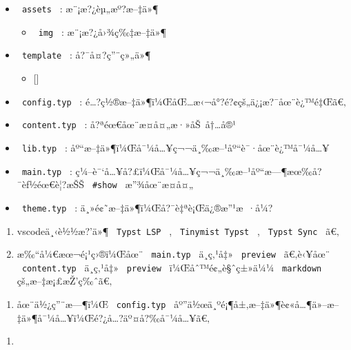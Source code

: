 \begin{itemize}
\item
  \texttt{\ assets\ } : æ¨¡æ?¿èµ„æº?æ--‡ä»¶

  \begin{itemize}
  \tightlist
  \item
    \texttt{\ img\ } : æ¨¡æ?¿å›¾ç‰‡æ--‡ä»¶
  \end{itemize}
\item
  \texttt{\ template\ } : å?¯å¤?ç''¨ç»„ä»¶

  \begin{itemize}
  \tightlist
  \item
    {[}{]}
  \end{itemize}
\item
  \texttt{\ config.typ\ } :
  é\ldots?ç½®æ--‡ä»¶ï¼ŒåŒ\ldots æ‹¬å°?é?¢çš„ä¿¡æ?¯åœ¨è¿™é‡Œã€‚
\item
  \texttt{\ content.typ\ } : å?ªéœ€åœ¨æ­¤å¤„æ·»åŠ~å†\ldots å®¹
\item
  \texttt{\ lib.typ\ } :
  åº``æ--‡ä»¶ï¼Œå¯¼å\ldots¥ç¬¬ä¸‰æ--¹åº``è¯·åœ¨è¿™å¯¼å\ldots¥
\item
  \texttt{\ main.typ\ } :
  ç¼--è¯`å\ldots¥å?£ï¼Œå¯¼å\ldots¥ç¬¬ä¸‰æ--¹åº``æ---¶æœ‰å?¯èƒ½éœ€è¦?æŠŠ
  \texttt{\ \#show\ } æ''¾åœ¨æ­¤å¤„
\item
  \texttt{\ theme.typ\ } : ä¸»é¢˜æ--‡ä»¶ï¼Œå?¯è‡ªè¡Œä¿®æ''¹æ~·å¼?
\end{itemize}

\begin{enumerate}
\tightlist
\item
  vscodeä¸‹è½½æ?'ä»¶ \texttt{\ Typst\ LSP\ } ,
  \texttt{\ Tinymist\ Typst\ } , \texttt{\ Typst\ Sync\ } ã€‚
\item
  æ‰``å¼€æœ¬é¡¹ç›®ï¼Œåœ¨ \texttt{\ main.typ\ } ä¸­ç‚¹å‡»
  \texttt{\ preview\ } ã€‚è‹¥åœ¨ \texttt{\ content.typ\ } ä¸­ç‚¹å‡»
  \texttt{\ preview\ } ï¼Œåˆ™é¢„è§ˆç±»ä¼¼ \texttt{\ markdown\ }
  çš„æ--‡æ¡£æŽ'ç‰ˆã€‚
\end{enumerate}

\begin{enumerate}
\tightlist
\item
  åœ¨ä½¿ç''¨æ---¶ï¼Œ \texttt{\ config.typ\ }
  åº''ä½œä¸ºé¡¶å±‚æ--‡ä»¶è¢«å\ldots¶ä»--æ--‡ä»¶å¯¼å\ldots¥ï¼Œé?¿å\ldots?äº¤å?‰å¯¼å\ldots¥ã€‚
\end{enumerate}

\begin{enumerate}
\tightlist
\item
\end{enumerate}

